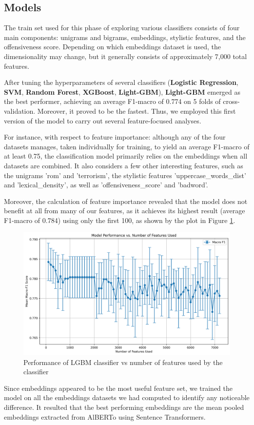 \subsection{Models}

The train set used for this phase of exploring various classifiers consists of four main components: unigrams and bigrams, embeddings, stylistic features, and the offensiveness score. Depending on which embeddings dataset is used, the dimensionality may change, but it generally consists of approximately 7,000 total features.
{}

After tuning the hyperparameters of several classifiers (\textbf{Logistic Regression}, \textbf{SVM}, \textbf{Random Forest}, \textbf{XGBoost}, \textbf{Light-GBM}), \textbf{Light-GBM} emerged as the best performer, achieving an average F1-macro of 0.774 on 5 folds of cross-validation. Moreover, it proved to be the fastest. Thus, we employed this first version of the model to carry out several feature-focused analyses.

For instance, with respect to feature importance: although any of the four datasets manages, taken individually for training, to yield an average F1-macro of at least 0.75, the classification model primarily relies on the embeddings when all datasets are combined. It also considers a few other interesting features, such as the unigrams 'rom' and 'terrorism', the stylistic features 'uppercase\_words\_dist' and 'lexical\_density', as well as 'offensiveness\_score' and 'badword'.

Moreover, the calculation of feature importance revealed that the model does not benefit at all from many of our features, as it achieves its highest result (average F1-macro of 0.784) using only the first 100, as shown by the plot in Figure \ref{fig:features}.

\begin{figure}
    \includegraphics[width=\columnwidth]{../../results/images/model_n_feats.png}
    \caption{Performance of LGBM classifier vs number of features used by the classifier}
    \label{fig:features}
\end{figure}
Since embeddings appeared to be the most useful feature set, we trained the model on all the embeddings datasets we had computed to identify any noticeable difference. It resulted that the best performing embeddings are the mean pooled embeddings extracted from AlBERTo using Sentence Transformers.

